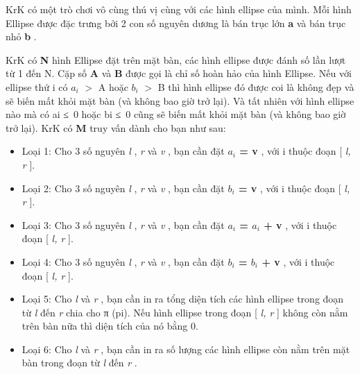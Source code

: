 





   KrK có một trò chơi vô cùng thú vị cùng với các hình ellipse của mình. Mỗi hình Ellipse được đặc trưng bởi 2 con số nguyên dương là bán trục lớn   \textbf{    a   }   và bán trục nhỏ   \textbf{    b   }   .  

   KrK có   \textbf{    N   }   hình Ellipse đặt trên mặt bàn, các hình ellipse được đánh số lần lượt từ 1 đến N. Cặp số   \textbf{    A   }   và   \textbf{    B   }   được gọi là chỉ số hoàn hảo của hình Ellipse. Nếu với ellipse thứ i có $a_{i}$   $>$ A hoặc $b_{i}$   $>$ B thì hình ellipse đó được coi là không đẹp và sẽ biến mất khỏi mặt bàn (và không bao giờ trở lại). Và tất nhiên với hình ellipse nào mà có ai ≤ 0 hoặc bi ≤ 0 cũng sẽ biến mất khỏi mặt bàn (và không bao giờ trở lại). KrK có   \textbf{    M   }   truy vấn dành cho bạn như sau:  


\begin{itemize}
	\item     Loại 1: Cho 3 số nguyên    \emph{     l    }    ,    \emph{     r    }    và    \emph{     v    }    , bạn cần đặt    \textbf{     $a_{i}$     = v    }    , với i thuộc đoạn [    \emph{     l, r    }    ].   
	\item     Loại 2: Cho 3 số nguyên    \emph{     l    }    ,    \emph{     r    }    và    \emph{     v    }    , bạn cần đặt    \textbf{     $b_{i}$     = v    }    , với i thuộc đoạn [    \emph{     l, r    }    ].   
	\item     Loại 3: Cho 3 số nguyên    \emph{     l    }    ,    \emph{     r    }    và    \emph{     v    }    , bạn cần đặt    \textbf{     $a_{i}$     = $a_{i}$     + v    }    , với i thuộc đoạn [    \emph{     l, r    }    ].   
	\item     Loại 4: Cho 3 số nguyên    \emph{     l    }    ,    \emph{     r    }    và    \emph{     v    }    , bạn cần đặt    \textbf{     $b_{i}$     = $b_{i}$     + v    }    , với i thuộc đoạn [    \emph{     l, r    }    ].   
	\item     Loại 5: Cho    \emph{     l    }    và    \emph{     r    }    , bạn cần in ra tổng diện tích các hình ellipse trong đoạn từ    \emph{     l    }    đến    \emph{     r    }    chia cho π (pi). Nếu hình ellipse trong đoạn [    \emph{     l, r    }    ] không còn nằm trên bàn nữa thì diện tích của nó bằng 0.   
	\item     Loại 6: Cho    \emph{     l    }    và    \emph{     r    }    , bạn cần in ra số lượng các hình ellipse còn nằm trên mặt bàn trong đoạn từ    \emph{     l    }    đến    \emph{     r    }    .   
\end{itemize}



